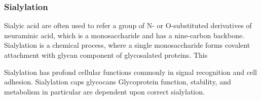 \subsubsection {Sialylation}
Sialyic acid are often used to refer a group of N- or O-substituted derivatives of neuraminic acid, which is a monosaccharide and has a nine-carbon backbone.~\cite{Vocadlo_2009} Sialylation is a chemical process, where a single monosaccharide forms covalent attachment with glycan component of glycosalated proteins. This  

Sialylation has profond cellular functions commonly in signal recognition and cell adhesion. Sialylation caps glycocans Glycoprotein function, stability, and metabolism in particular are dependent upon correct sialylation.